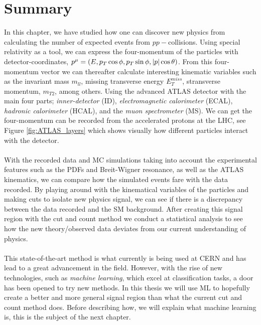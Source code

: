 \documentclass[12pt, a4paper]{book}
\begin{document}
\clearpage
\section{Summary}
In this chapter, we have studied how one can discover new physics from calculating the number of expected events from $pp-$collisions. Using special relativity as a tool, we can express the four-momentum of the particles with 
detector-coordinates, $p^\mu=(E,p_T\cos\phi,p_T\sin\phi,\abs{p}\cos\theta)$. From this four-momentum vector we can thereafter calculate interesting kinematic variables such as the invariant mass $m_{ll}$, missing transverse energy $E_T^{miss}$, 
stransverse momentum, $m_{T2}$, among others. Using the advanced ATLAS detector with the main four parts; \textit{inner-detector} (ID), \textit{electromagnetic calorimeter} (ECAL), \textit{hadronic calorimeter} (HCAL), and the \textit{muon spectrometer} (MS). 
We can get the four-momentum can be recorded from the accelerated protons at the LHC, see Figure \ref{fig:ATLAS_layers} which shows visually how different particles interact with the detector.\\
\\With the recorded data and MC simulations taking into account the experimental features such as the PDFs and Breit-Wigner resonance, as well as the ATLAS kinematics, we can compare how the simulated events fare with the data recorded. 
By playing around with the kinematical variables of the particles and making cuts to isolate new physics signal, we can see if there is a discrepancy between the data recorded and the SM background. After creating this signal region with the cut and count 
method we conduct a statistical analysis to see how the new theory/observed data deviates from our current understanding of physics.\\
\\This state-of-the-art method is what currently is being used at CERN and has lead to a great advancement in the field. However, with the rise of new technologies, such as \textit{machine learning}, which excel at classification tasks, a door has been 
opened to try new methods. In this thesis we will use ML to hopefully create a better and more general signal region than what the current cut and count method does. Before describing how, we will explain what machine learning is, this is the subject 
of the next chapter.
\end{document}
